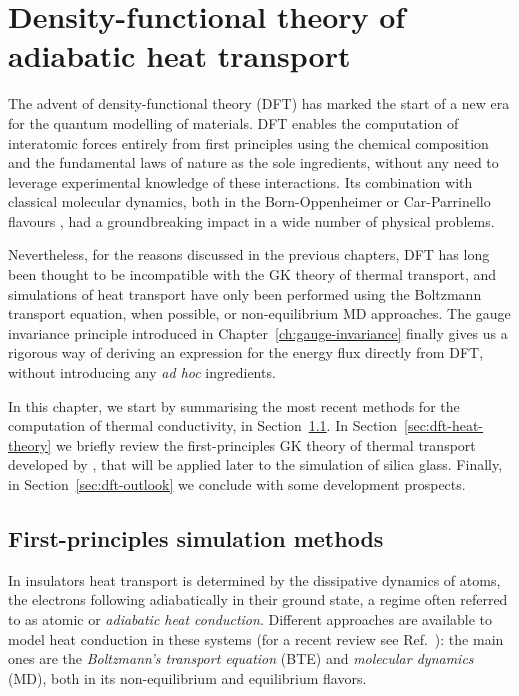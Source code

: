 \chapter{Density-functional theory of adiabatic heat transport} \label{ch:dft-heat}

The advent of density-functional theory (DFT) \cite{Hohenberg1964,Kohn1965,Martin2008} has marked the start of a new era for the quantum modelling of materials. DFT enables the computation of interatomic forces entirely from first principles using the chemical composition and the fundamental laws of nature as the sole ingredients, without any need to leverage experimental knowledge of these interactions.
Its combination with classical molecular dynamics, both in the Born-Oppenheimer or Car-Parrinello flavours \cite{Car1985,Marx2009}, had a groundbreaking impact in a wide number of physical problems.

Nevertheless, for the reasons discussed in the previous chapters, DFT has long been thought to be incompatible with the GK theory of thermal transport, and \abinitio simulations of heat transport have only been performed using the Boltzmann transport equation, when possible, or non-equilibrium MD approaches.
The gauge invariance principle introduced in Chapter~\ref{ch:gauge-invariance} finally gives us a rigorous way of deriving an expression for the energy flux directly from DFT, without introducing any \emph{ad hoc} ingredients. 

In this chapter, we start by summarising the most recent \abinitio methods for the computation of thermal conductivity, in Section~\ref{sec:abinitio-methods}. In Section~\ref{sec:dft-heat-theory} we briefly review the first-principles GK theory of thermal transport developed by \citet{Marcolongo2016}, that will be applied later to the simulation of silica glass. Finally, in Section~\ref{sec:dft-outlook} we conclude with some development prospects. 



\newpage
\section{First-principles simulation methods}  \label{sec:abinitio-methods}
In insulators heat transport is determined by the dissipative dynamics of atoms, the electrons following adiabatically in their ground state, a regime often referred to as atomic or \emph{adiabatic heat conduction}. Different approaches are available to model heat conduction in these systems (for a recent review see Ref.~\cite{Fugallo2018}): the main ones are the \emph{Boltzmann's transport equation} (BTE)  %
and \emph{molecular dynamics} (MD), both in its non-equilibrium and equilibrium flavors. 
%

